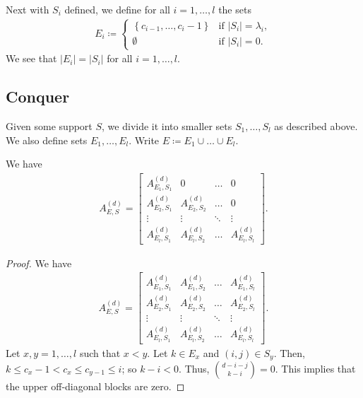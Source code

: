 Next with \( S_i \) defined, we define for all \( i=1, \dots, l \) the sets
\begin{align*}
    E_i \coloneqq \begin{cases}
        \left\{ c_{i-1}, \dots, c_i - 1 \right\} & \text{if } \lvert S_i \rvert = \lambda_i, \\
        \emptyset & \text{if } \lvert S_i \rvert = 0.
    \end{cases}
\end{align*}
We see that \( \lvert E_i \rvert = \lvert S_i \rvert \) for all \( i = 1, \dots, l \). 

\subsection*{Conquer}

Given some support \( S \), we divide it into smaller sets \( S_1, \dots, S_l \) as described above. We also define sets \( E_1, \dots, E_l \). Write \( E \coloneqq E_1 \cup \dots \cup E_l \).

\begin{proposition}
    We have 
    \begin{align*}
        A_{E,S}^{(d)} = 
        \begin{bmatrix}
            A_{E_1,S_1}^{(d)} & 0 & \dots & 0 \\
            A_{E_2,S_1}^{(d)} & A_{E_2,S_2}^{(d)} & \dots & 0 \\
            \vdots & \vdots & \ddots & \vdots \\
            A_{E_l,S_1}^{(d)} & A_{E_l,S_2}^{(d)} & \dots & A_{E_l,S_l}^{(d)}
        \end{bmatrix}.
    \end{align*}
\end{proposition}

\begin{proof}
    We have 
    \begin{align*}
        A_{E,S}^{(d)} = 
        \begin{bmatrix}
            A_{E_1,S_1}^{(d)} & A_{E_1,S_2}^{(d)} & \dots & A_{E_1,S_l}^{(d)} \\
            A_{E_2,S_1}^{(d)} & A_{E_2,S_2}^{(d)} & \dots & A_{E_2,S_l}^{(d)} \\
            \vdots & \vdots & \ddots & \vdots \\
            A_{E_l,S_1}^{(d)} & A_{E_l,S_2}^{(d)} & \dots & A_{E_l,S_l}^{(d)}
        \end{bmatrix}.
    \end{align*}
    Let \( x,y = 1, \dots , l \) such that \( x < y \). Let \( k \in E_x \) and \( (i,j) \in S_y \).
    Then, \( k \leq c_x - 1 < c_x \leq c_{y - 1} \leq i \); so \( k - i < 0 \). Thus, \( \binom{d-i-j}{k-i} = 0 \). This implies that the upper off-diagonal blocks are zero.
\end{proof}


